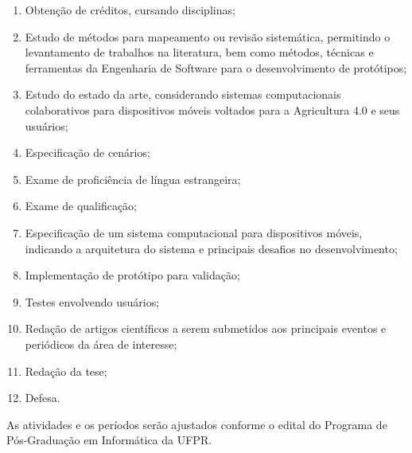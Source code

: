 \begin{enumerate}
	\item Obtenção de créditos, cursando disciplinas;
	\item Estudo de métodos para mapeamento ou revisão sistemática, permitindo o levantamento de trabalhos na literatura, bem como métodos, técnicas e ferramentas da Engenharia de Software para o desenvolvimento de protótipos;
	\item Estudo do estado da arte, considerando sistemas computacionais colaborativos para dispositivos móveis voltados para a Agricultura 4.0 e seus usuários;
	\item Especificação de cenários;
	\item Exame de proficiência de língua estrangeira;
	\item Exame de qualificação;
	\item Especificação de um sistema computacional para dispositivos móveis, indicando a arquitetura do sistema e principais desafios no desenvolvimento;
	\item Implementação de protótipo para validação;
	\item Testes envolvendo usuários;
	\item Redação de artigos científicos a serem submetidos aos principais eventos e periódicos da área de interesse;
	\item Redação da tese;
	\item Defesa.
\end{enumerate}

As atividades e os períodos serão ajustados conforme o edital do Programa de Pós-Graduação em Informática da UFPR.

